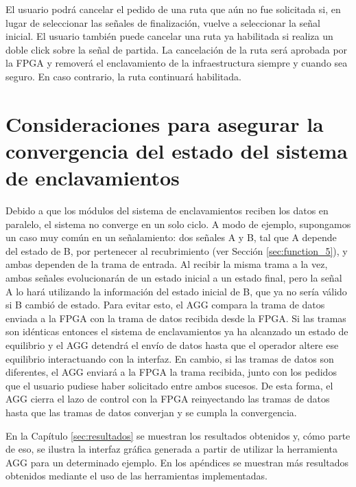 	El usuario podrá cancelar el pedido de una ruta que aún no fue solicitada si, en lugar de seleccionar las señales de finalización, vuelve a seleccionar la señal inicial. El usuario también puede cancelar una ruta ya habilitada si realiza un doble click sobre la señal de partida. La cancelación de la ruta será aprobada por la FPGA y removerá el enclavamiento de la infraestructura siempre y cuando sea seguro. En caso contrario, la ruta continuará habilitada.
	
	
		
	\section{Consideraciones para asegurar la convergencia del estado del sistema de enclavamientos}
	\label{sec:convergencia}
	
	Debido a que los módulos del sistema de enclavamientos reciben los datos en paralelo, el sistema no converge en un solo ciclo. A modo de ejemplo, supongamos un caso muy común en un señalamiento: dos señales A y B, tal que A depende del estado de B, por pertenecer al recubrimiento (ver Sección \ref{sec:function_5}), y ambas dependen de la trama de entrada. Al recibir la misma trama a la vez, ambas señales evolucionarán de un estado inicial a un estado final, pero la señal A lo hará utilizando la información del estado inicial de B, que ya no sería válido si B cambió de estado. Para evitar esto, el AGG compara la trama de datos enviada a la FPGA con la trama de datos recibida desde la FPGA. Si las tramas son idénticas entonces el sistema de enclavamientos ya ha alcanzado un estado de equilibrio y el AGG detendrá el envío de datos hasta que el operador altere ese equilibrio interactuando con la interfaz. En cambio, si las tramas de datos son diferentes, el AGG enviará a la FPGA la trama recibida, junto con los pedidos que el usuario pudiese haber solicitado entre ambos sucesos. De esta forma, el AGG cierra el lazo de control con la FPGA reinyectando las tramas de datos hasta que las tramas de datos converjan y se cumpla la convergencia.
	
	En la Capítulo \ref{sec:resultados} se muestran los resultados obtenidos y, cómo parte de eso, se ilustra la interfaz gráfica generada a partir de utilizar la herramienta AGG para un determinado ejemplo. En los apéndices se muestran más resultados obtenidos mediante el uso de las herramientas implementadas.

	

	